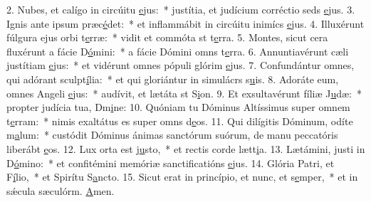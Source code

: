 2. Nubes, et calígo in circúitu \uline{e}jus:~* justítia, et judícium corréctio seds \uline{e}jus.
3. Ignis ante ipsum præc\uline{é}det:~* et inflammábit in circúitu inimícs \uline{e}jus.
4. Illuxérunt fúlgura ejus orbi t\uline{e}rræ:~* vidit et commóta st t\uline{e}rra.
5. Montes, sicut cera fluxérunt a fácie D\uline{ó}mini:~* a fácie Dómini omns t\uline{e}rra.
6. Annuntiavérunt cæli justítiam \uline{e}jus:~* et vidérunt omnes pópuli glórim \uline{e}jus.
7. Confundántur omnes, qui adórant sculpt\uline{í}lia:~* et qui gloriántur in simulácrs s\uline{u}is.
8. Adoráte eum, omnes Angeli \uline{e}jus:~* audívit, et lætáta st S\uline{i}on.
9. Et exsultavérunt fíliæ J\uline{u}dæ:~* propter judícia tua, Dm\uline{i}ne:
10. Quóniam tu Dóminus Altíssimus super omnem t\uline{e}rram:~* nimis exaltátus es super omns d\uline{e}os.
11. Qui dilígitis Dóminum, odíte m\uline{a}lum:~* custódit Dóminus ánimas sanctórum suórum, de manu peccatóris liberábt \uline{e}os.
12. Lux orta est j\uline{u}sto,~* et rectis corde lætt\uline{i}a.
13. Lætámini, justi in D\uline{ó}mino:~* et confitémini memóriæ sanctificatións \uline{e}jus.
14. Glória Patri, et F\uline{í}lio,~* et Spirítu S\uline{a}ncto.
15. Sicut erat in princípio, et nunc, et s\uline{e}mper,~* et in sǽcula sæculórm. \uline{A}men.
